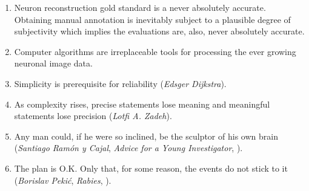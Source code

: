 \documentclass[10pt]{report}
\begin{document}
\begin{enumerate}
\medskip
\item Neuron reconstruction gold standard is a never absolutely accurate. Obtaining manual annotation is inevitably subject to a plausible degree of subjectivity which implies the evaluations are, also, never absolutely accurate.

\medskip 

\item Computer algorithms are irreplaceable tools for processing the ever growing neuronal image data. 

\medskip
  
\item Simplicity is prerequisite for reliability (\emph{Edsger Dijkstra}).

\medskip

\item As complexity rises, precise statements lose meaning and meaningful statements lose precision (\emph{Lotfi A. Zadeh}).

\medskip

\item Any man could, if he were so inclined, be the sculptor of his own brain (\emph{Santiago Ram\'{o}n y Cajal}, \emph{Advice for a Young Investigator}, ).

\medskip

\item The plan is O.K. Only that, for some reason, the events do not stick to it (\emph{Borislav Peki\'{c}}, \emph{Rabies}, ).

\end{enumerate}

\end{document}
